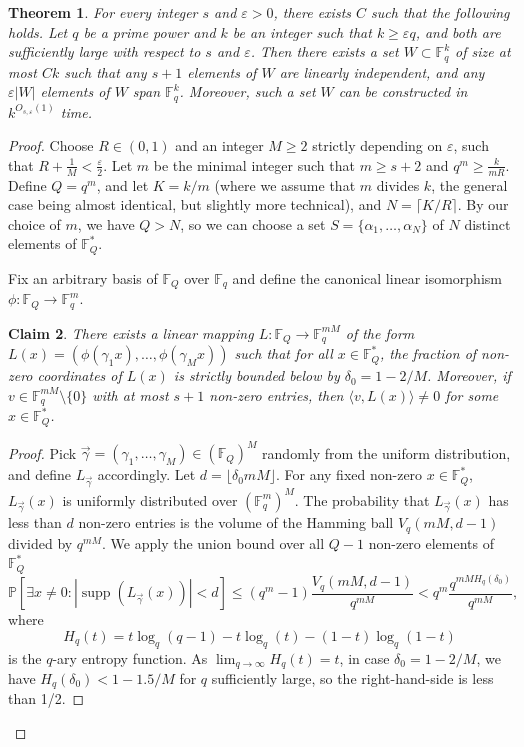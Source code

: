 \documentclass[11pt]{article}
\theoremstyle{plain}
\newtheorem{theorem}{Theorem}
\newtheorem{claim}[theorem]{Claim}
\theoremstyle{definition}
\DeclareMathOperator{\supp}{supp}
\begin{document}
\begin{theorem}
    For every integer $s$ and $\varepsilon>0$, there exists $C$ such that the following holds. 
Let $q$ be a prime power and $k$ be an integer such that $k\geq \varepsilon q$, and both are sufficiently large with respect to $s$ and $\varepsilon$. Then there exists a set $W\subset \mathbb{F}_q^k$ of size at most $Ck$ such that any $s+1$ elements of $W$ are linearly independent, and any $\varepsilon |W|$ elements of $W$ span $\mathbb{F}_q^k$. Moreover, such a set $W$ can be constructed in $k^{O_{s,\varepsilon}(1)}$ time.
\end{theorem}

\begin{proof}
Choose  $R \in (0, 1)$ and an integer $M \ge 2$ strictly depending on $\varepsilon$, such that $R+ \frac{1}{M}< \frac{\varepsilon}{2}$.
Let $m$ be the minimal integer such that $m \ge s+2$ and $q^m \ge \frac{k}{mR}$. Define $Q = q^m$, and let $K = k/m$ (where we assume that $m$ divides $k$, the general case being almost identical, but slightly more technical), and  $N = \lceil K/R \rceil$. By our choice of $m$, we have $Q>N$, so we can choose a set $S = \{\alpha_1, \dots, \alpha_N\}$  of $N$ distinct elements of $\mathbb{F}_Q^*$.

Fix an arbitrary basis of $\mathbb{F}_Q$ over $\mathbb{F}_q$ and define the canonical linear isomorphism $\phi : \mathbb{F}_Q \rightarrow \mathbb{F}_q^m$.

\begin{claim}
There exists a linear mapping $L : \mathbb{F}_Q \to \mathbb{F}_{q}^{mM}$ of the form $L(x) = \left(\phi(\gamma_1 x), \dots, \phi(\gamma_M x)\right)$ such that for all $x \in \mathbb{F}_Q^*$, the  fraction of non-zero coordinates of $L(x)$ is strictly bounded below by $\delta_{0} = 1 - 2/M$. Moreover, if $v\in \mathbb{F}_q^{mM}\setminus\{0\}$ with at most  $s+1$ non-zero entries, then $\langle v,L(x)\rangle\neq 0$ for some $x\in \mathbb{F}_Q^*$.
\end{claim}
\begin{proof} Pick $\vec{\gamma} = (\gamma_1, \dots, \gamma_M) \in (\mathbb{F}_Q)^M$ randomly from the uniform distribution, and define $L_{\vec{\gamma}}$ accordingly. Let $d = \lfloor \delta_{0} mM \rfloor$. For any fixed non-zero $x \in \mathbb{F}_Q^*$,  $L_{\vec{\gamma}}(x)$ is uniformly distributed over $(\mathbb{F}_q^{m})^M$. The probability that $L_{\vec{\gamma}}(x)$ has less than $d$ non-zero entries is the volume of the Hamming ball $V_q(mM, d-1)$ divided by $q^{mM}$. We apply the union bound over all $Q-1$ non-zero elements of $\mathbb{F}_Q^*$
$$\mathbb{P} \left[ \exists x \neq 0 : |\supp(L_{\vec{\gamma}}(x))|<d\right] \le (q^m - 1) \frac{V_q(mM, d-1)}{q^{mM}} < q^m \frac{q^{mMH_q(\delta_{0})}}{q^{mM}},$$
where $$H_q(t) = t \log_q(q-1) - t \log_q(t) - (1-t) \log_q(1-t)$$ is the $q$-ary entropy function. As $\lim_{q\rightarrow\infty} H_q(t)=t$, in case $\delta_0=1-2/M$, we have $H_q(\delta_0)< 1-1.5/M$ for $q$ sufficiently large, so the right-hand-side is less than 1/2.


\end{proof}
\end{proof}
\end{document}
